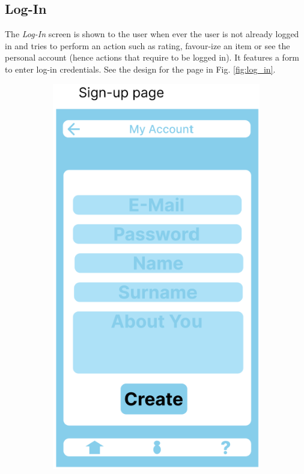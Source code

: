 \subsection*{Log-In}

The \textsl{Log-In} screen is shown to the user when ever the user is not already logged in and tries to perform an action such as rating, favour-ize an item or see the personal account (hence actions that require to be logged in).
It features a form to enter log-in credentials. See the design for the page in Fig. \ref{fig:log_in}.


\begin{figure}
	\centering
	\begin{subfigure}[T]{0.4\linewidth}
		\includegraphics[width=\linewidth]{figures/sign_up.png}

\end{subfigure}
\end{figure}

